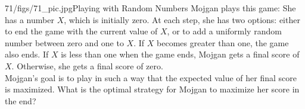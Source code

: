 \begin{problem}{71/figs/71_pic.jpg}{Playing with Random Numbers} Mojgan plays this game: She has a number $X$, which is initially zero. At each step, she has two options: either to end the game with the current value of $X$, or to add a uniformly random number between zero and one to $X$. If $X$ becomes greater than one, the game also ends.
	If $X$ is less than one when the game ends, Mojgan gets a final score of $X$. Otherwise, she gets a final score of zero.\\[0.2cm]
	
	Mojgan's goal is to play in such a way that the expected value of her final score is maximized. What is the optimal strategy for Mojgan to maximize her score in the end?
\end{problem}
